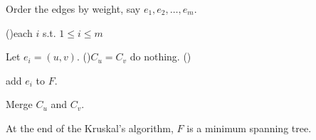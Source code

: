 \begin{algorithm}[H]
    \caption{Kruskal's algorithm(Implementation way)}
    \DontPrintSemicolon
    Order the edges by weight, say \(e_1, e_2, \dots , e_m\). 

    \For(){each \(i\) s.t. \(1 \le i \le m\)}{
        Let \(e_i = (u, v)\). 
        \If(){\(C_u = C_v\)} {
            do nothing.
        } 
        \Else() {
            add \(e_i\) to \(F\).

            Merge \(C_u\) and \(C_v\).    
        }
    }  
\end{algorithm}

\begin{claim}
    At the end of the Kruskal's algorithm, \(F\) is a minimum spanning tree. 
\end{claim}

